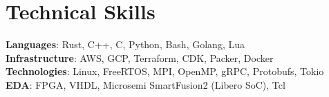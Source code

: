 \documentclass[letterpaper,11pt]{article}
\begin{document}
\section{Technical Skills}
 \begin{itemize}[leftmargin=0.15in, label={}]
    \small{\item{
    \textbf{Languages}{: Rust, C++, C, Python, Bash, Golang, Lua} \\
    \textbf{Infrastructure}{: AWS, GCP, Terraform, CDK, Packer, Docker} \\
    \textbf{Technologies}{: Linux, FreeRTOS, MPI, OpenMP, gRPC, Protobufs, Tokio} \\
    \textbf{EDA}{: FPGA, VHDL, Microsemi SmartFusion2 (Libero SoC), Tcl} \\
    }}
 \end{itemize}

\vspace{-13.0pt}
\end{document}
